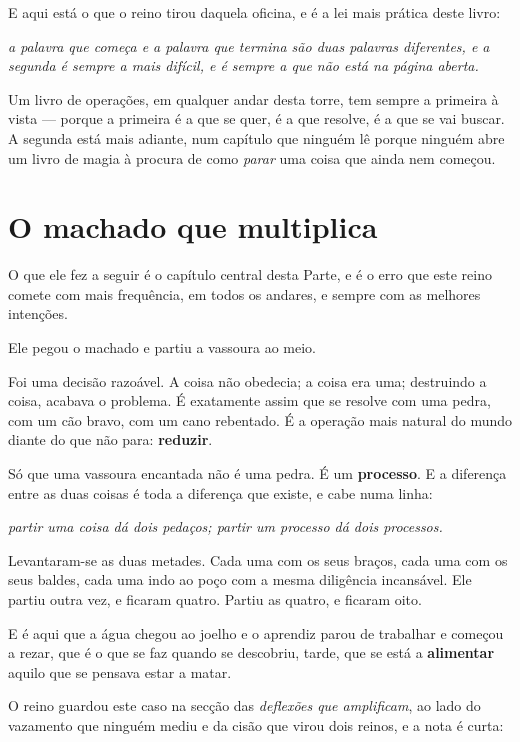\documentclass[livro.tex]{subfiles}
\begin{document}
E aqui está o que o reino tirou daquela oficina, e é a lei mais prática deste livro:

\emph{a palavra que começa e a palavra que termina são duas palavras diferentes, e a
segunda é sempre a mais difícil, e é sempre a que não está na página aberta.}

Um livro de operações, em qualquer andar desta torre, tem sempre a primeira à vista ---
porque a primeira é a que se quer, é a que resolve, é a que se vai buscar. A segunda está
mais adiante, num capítulo que ninguém lê porque ninguém abre um livro de magia à procura
de como \emph{parar} uma coisa que ainda nem começou.

\section{O machado que multiplica}

O que ele fez a seguir é o capítulo central desta Parte, e é o erro que este reino comete
com mais frequência, em todos os andares, e sempre com as melhores intenções.

Ele pegou o machado e partiu a vassoura ao meio.

\medskip

Foi uma decisão razoável. A coisa não obedecia; a coisa era uma; destruindo a coisa,
acabava o problema. É exatamente assim que se resolve com uma pedra, com um cão bravo, com
um cano rebentado. É a operação mais natural do mundo diante do que não para:
\textbf{reduzir}.

Só que uma vassoura encantada não é uma pedra. É um \textbf{processo}. E a diferença entre
as duas coisas é toda a diferença que existe, e cabe numa linha:

\emph{partir uma coisa dá dois pedaços; partir um processo dá dois processos.}

\medskip

Levantaram-se as duas metades. Cada uma com os seus braços, cada uma com os seus baldes,
cada uma indo ao poço com a mesma diligência incansável. Ele partiu outra vez, e ficaram
quatro. Partiu as quatro, e ficaram oito.

E é aqui que a água chegou ao joelho e o aprendiz parou de trabalhar e começou a rezar,
que é o que se faz quando se descobriu, tarde, que se está a \textbf{alimentar} aquilo que
se pensava estar a matar.

\medskip

O reino guardou este caso na secção das \emph{deflexões que amplificam}, ao lado do
vazamento que ninguém mediu e da cisão que virou dois reinos, e a nota é curta:
\end{document}
